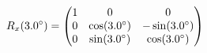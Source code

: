 \documentclass[preview]{standalone}
\begin{document}
\begin{align*}
\special{dvisvgm:raw <g id='unique000'>}R_x(3.0^\circ) = \begin{pmatrix} 1 & 0 & 0 \\ 0 & \cos(3.0^\circ) & -\sin(3.0^\circ) \\ 0 & \sin(3.0^\circ) & \cos(3.0^\circ) \end{pmatrix}\special{dvisvgm:raw </g>}
\end{align*}
\end{document}
